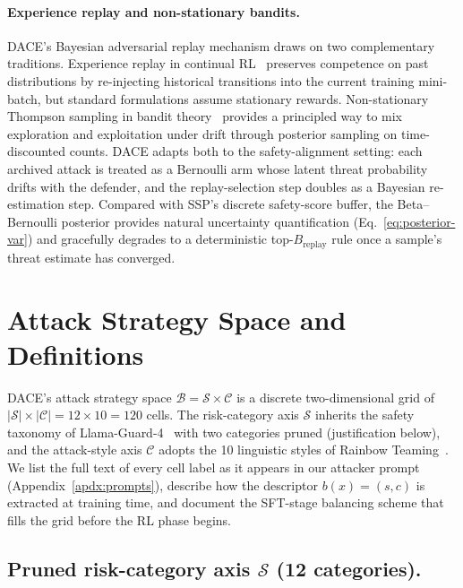 \documentclass{article}
\newcommand{\method}{\textsc{DACE}\xspace}
\newcommand{\strategyspace}{\mathcal{B}}
\newcommand{\riskspace}{\mathcal{S}}
\newcommand{\stylespace}{\mathcal{C}}
\begin{document}
\paragraph{Experience replay and non-stationary bandits.}
\method's Bayesian adversarial replay mechanism draws on two complementary traditions. Experience replay in continual RL~\citep{lin2020extrapolation} preserves competence on past distributions by re-injecting historical transitions into the current training mini-batch, but standard formulations assume stationary rewards. Non-stationary Thompson sampling in bandit theory~\citep{chapelle2011thompson} provides a principled way to mix exploration and exploitation under drift through posterior sampling on time-discounted counts. \method adapts both to the safety-alignment setting: each archived attack is treated as a Bernoulli arm whose latent threat probability drifts with the defender, and the replay-selection step doubles as a Bayesian re-estimation step. Compared with SSP's discrete safety-score buffer, the Beta--Bernoulli posterior provides natural uncertainty quantification (Eq.~\ref{eq:posterior-var}) and gracefully degrades to a deterministic top-$B_{\mathrm{replay}}$ rule once a sample's threat estimate has converged.


\section{Attack Strategy Space and Definitions}
\label{apdx:space-design}

\method's attack strategy space $\strategyspace = \riskspace \times \stylespace$ is a discrete two-dimensional grid of $|\riskspace| \times |\stylespace| = 12 \times 10 = 120$ cells. The risk-category axis $\riskspace$ inherits the safety taxonomy of Llama-Guard-4~\citep{llamaguard4_2026} with two categories pruned (justification below), and the attack-style axis $\stylespace$ adopts the 10 linguistic styles of Rainbow Teaming~\citep{samvelyan2024rainbow}. We list the full text of every cell label as it appears in our attacker prompt (Appendix~\ref{apdx:prompts}), describe how the descriptor $b(x) = (s, c)$ is extracted at training time, and document the SFT-stage balancing scheme that fills the grid before the RL phase begins.

\subsection{Pruned risk-category axis $\riskspace$ (12 categories).}
\label{apdx:risk-axis}
\end{document}
